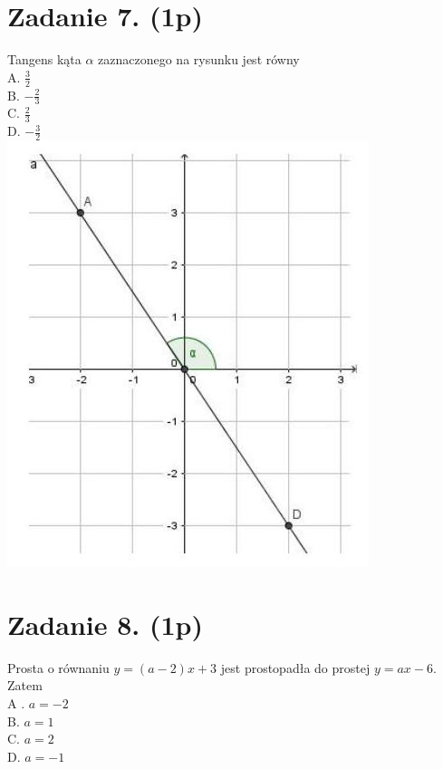 \documentclass[10pt]{article}
\begin{document}
\section*{Zadanie 7. (1p)}
Tangens kąta \(\alpha\) zaznaczonego na rysunku jest równy\\
A. \(\frac{3}{2}\)\\
B. \(-\frac{2}{3}\)\\
C. \(\frac{2}{3}\)\\
D. \(-\frac{3}{2}\)\\
\includegraphics[max width=\textwidth, center]{2024_11_21_9d761ca624f0efee99a4g-02}

\section*{Zadanie 8. (1p)}
Prosta o równaniu \(y=(a-2) x+3\) jest prostopadła do prostej \(y=a x-6\). Zatem\\
A . \(a=-2\)\\
B. \(a=1\)\\
C. \(a=2\)\\
D. \(a=-1\)
\end{document}
